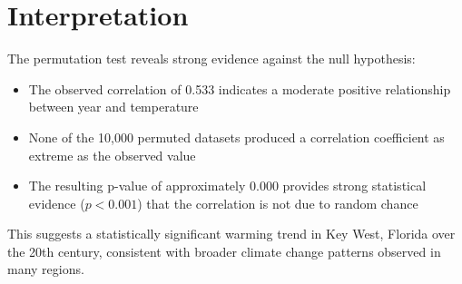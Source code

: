 \documentclass[10pt,a4paper]{article}
\begin{document}
\section*{Interpretation}
The permutation test reveals strong evidence against the null hypothesis:
\begin{itemize}
    \item The observed correlation of 0.533 indicates a moderate positive relationship between year and temperature
    \item None of the 10,000 permuted datasets produced a correlation coefficient as extreme as the observed value
    \item The resulting p-value of approximately 0.000 provides strong statistical evidence ($p < 0.001$) that the correlation is not due to random chance
\end{itemize}

This suggests a statistically significant warming trend in Key West, Florida over the 20th century, consistent with broader climate change patterns observed in many regions.
\end{document}
